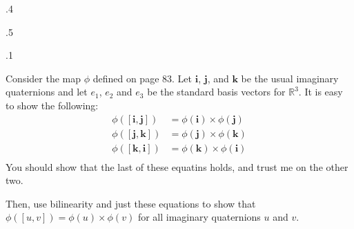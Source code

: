 \documentclass[minion]{homework}
\newcommand{\Reals}{\mathbb{R}}
\begin{document}
\begin{problems}

.4

.5

.1

\problem Consider the map $\phi$ defined on page 83.  Let $\mathbf i$, $\mathbf j$, and $\mathbf k$ be the
usual imaginary quaternions and let $e_1$, $e_2$ and $e_3$ be the standard basis vectors for $\Reals^3$.
It is easy to show the following:
\begin{align}
\phi([\mathbf i, \mathbf j]) &= \phi(\mathbf i) \times \phi(\mathbf j)\\
\phi([\mathbf j, \mathbf k]) &= \phi(\mathbf j) \times \phi(\mathbf k)\\
\phi([\mathbf k, \mathbf i]) &= \phi(\mathbf k) \times \phi(\mathbf i)\\
\end{align}
You should show that the last of these equatins holds, and trust me on the other two.

Then, use bilinearity and just these equations to show that $\phi([u,v])=\phi(u)\times \phi(v)$
for all imaginary quaternions $u$ and $v$.
\end{problems}
\end{document}
